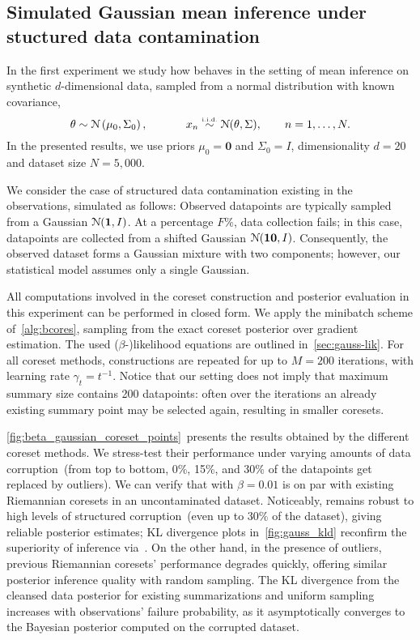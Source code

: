 \subsection{Simulated Gaussian mean inference under stuctured data contamination}
\label{subsec:gauss-expt}

In the first experiment we study how \bcores{} behaves in the setting of mean inference on synthetic $d$-dimensional data, sampled \iid from a normal distribution with known covariance,
\[
\theta \sim \distNorm\left(\mu_0, \Sigma_0\right),
\qquad 
\;\;\;\;\;
x_n \distiid \distNorm(\theta, \Sigma),
\qquad
n = 1, \ldots, N.
\label{eq:mvn-expt}
\]
In the presented results, we use priors $\mu_0=\mathbf{0}$ and $\Sigma_0=I$,  dimensionality $d=20$ and dataset size $N=5,000$.
 
We consider the case of structured data contamination existing in the observations, simulated as follows: Observed datapoints are typically sampled from a Gaussian $ \mathcal{N}(\mathbf{1}, I)$. At a percentage $F\%$,  data collection fails; in this case, datapoints are collected from a shifted Gaussian $ \mathcal{N}(\mathbf{10}, I)$. Consequently, the observed dataset forms a Gaussian mixture with two components; however, our statistical model assumes only a single Gaussian.

All computations involved in the coreset construction and posterior evaluation in this experiment can be performed in closed form. We apply the minibatch scheme of~\cref{alg:bcores}, sampling from the exact coreset posterior over gradient estimation. The used \mbox{($\beta$-)}likelihood equations are outlined in~\cref{sec:gauss-lik}. For all coreset methods, constructions are repeated for up to $M=200$ iterations, with learning rate $\gamma_t = t^{-1}$. Notice that our setting does not imply that maximum summary size contains 200 datapoints: often over the iterations an already existing summary point may be selected again, resulting in smaller coresets.

\cref{fig:beta_gaussian_coreset_points}~presents the results obtained by the different coreset methods. We stress-test their performance under varying amounts of data corruption~(from top to bottom, 0\%, 15\%, and 30\% of the datapoints get replaced by outliers). We can verify that \bcores{} with $\beta=0.01$ is on par with existing Riemannian coresets in an uncontaminated dataset. Noticeably, \bcores{} remains robust to high levels of structured corruption~(even up to $30\%$ of the dataset), giving reliable posterior estimates; KL divergence plots in~\cref{fig:gauss_kld} reconfirm the superiority of inference via~\bcores{}. On the other hand, in the presence of outliers, previous Riemannian coresets' performance degrades quickly, offering similar posterior inference quality with random sampling. The KL divergence from the cleansed data posterior for existing summarizations and uniform sampling increases with observations' failure probability, as it asymptotically converges to the Bayesian posterior computed on the corrupted dataset. 

